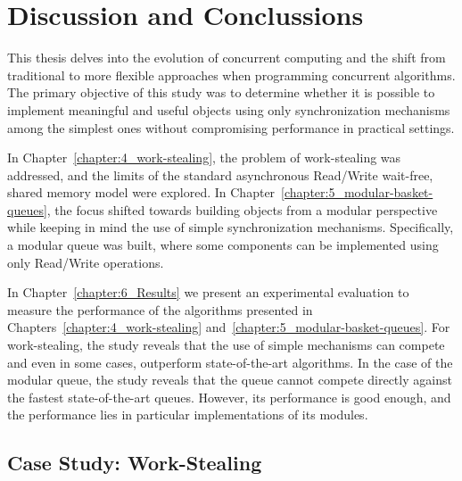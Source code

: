 \chapter{Discussion and Conclussions}

This thesis delves into the evolution of concurrent computing and the shift from traditional to more flexible approaches when programming concurrent algorithms. The primary objective of this study was to determine whether it is possible to implement meaningful and useful objects using only synchronization mechanisms among the simplest ones without compromising performance in practical settings.

In Chapter~\ref{chapter:4_work-stealing}, the problem of work-stealing was addressed, and the limits of the standard asynchronous Read/Write wait-free, shared memory model were explored. In Chapter~\ref{chapter:5_modular-basket-queues}, the focus shifted towards building objects from a modular perspective while keeping in mind the use of simple synchronization mechanisms. Specifically, a modular queue was built, where some components can be implemented using only Read/Write operations.


In Chapter~\ref{chapter:6_Results} we present an experimental evaluation to measure the performance of the algorithms presented in Chapters~\ref{chapter:4_work-stealing} and~\ref{chapter:5_modular-basket-queues}. For work-stealing, the study reveals that the use of simple mechanisms can compete and even in some cases, outperform state-of-the-art algorithms. In the case of the modular queue, the study reveals that the queue cannot compete directly against the fastest state-of-the-art queues. However, its performance is good enough, and the performance lies in particular implementations of its modules.


\section{\label{sec:experiment-conclussions} Case Study: Work-Stealing}

